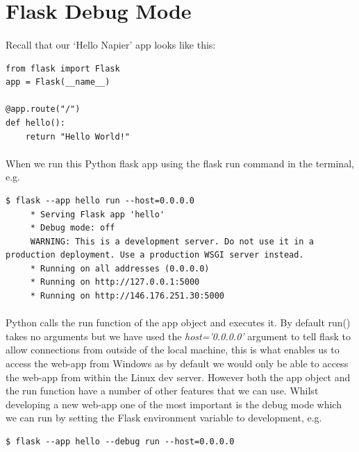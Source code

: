 \documentclass[12pt, a4paper, oneside]{book}
\begin{document}
\section{Flask Debug Mode}
\label{debug}
\paragraph{} Recall that our `Hello Napier' app looks like this:

\begin{lstlisting}
from flask import Flask
app = Flask(__name__)

@app.route("/")
def hello():
    return "Hello World!"
\end{lstlisting}

\paragraph{} When we run this Python flask app using the flask run command in the terminal, e.g.

\begin{lstlisting}[style=DOS]
    $ flask --app hello run --host=0.0.0.0 
     * Serving Flask app 'hello'
     * Debug mode: off
     WARNING: This is a development server. Do not use it in a production deployment. Use a production WSGI server instead.
     * Running on all addresses (0.0.0.0)
     * Running on http://127.0.0.1:5000
     * Running on http://146.176.251.30:5000
\end{lstlisting}

\paragraph{} Python calls the run function of the app object and executes it. By default run() takes no arguments but we have used the \emph{host='0.0.0.0'} argument to tell flask to allow connections from outside of the local machine, this is what enables us to access the web-app from Windows as by default we would only be able to access the web-app from within the Linux dev server. However both the app object and the run function have a number of other features that we can use. Whilst developing a new web-app one of the most important is the debug mode which we can run by setting the Flask environment variable to development, e.g.

\begin{lstlisting}[style=DOS]
    $ flask --app hello --debug run --host=0.0.0.0
\end{lstlisting}
\end{document}
